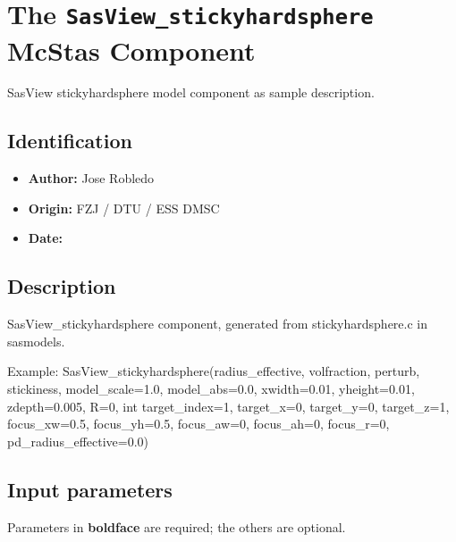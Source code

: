 \section{The \texttt{SasView\_stickyhardsphere} McStas Component}
SasView stickyhardsphere model component as sample description.

\subsection*{Identification}
\begin{itemize}
  \item \textbf{Author:} Jose Robledo
  \item \textbf{Origin:} FZJ / DTU / ESS DMSC
  \item \textbf{Date:} 
\end{itemize}

\subsection*{Description}
SasView\_stickyhardsphere component, generated from stickyhardsphere.c in sasmodels.

Example: SasView\_stickyhardsphere(radius\_effective, volfraction, perturb, stickiness, model\_scale=1.0, model\_abs=0.0, xwidth=0.01, yheight=0.01, zdepth=0.005, R=0, int target\_index=1, target\_x=0, target\_y=0, target\_z=1, focus\_xw=0.5, focus\_yh=0.5, focus\_aw=0, focus\_ah=0, focus\_r=0, pd\_radius\_effective=0.0)

\subsection*{Input parameters}
Parameters in \textbf{boldface} are required; the others are optional.

